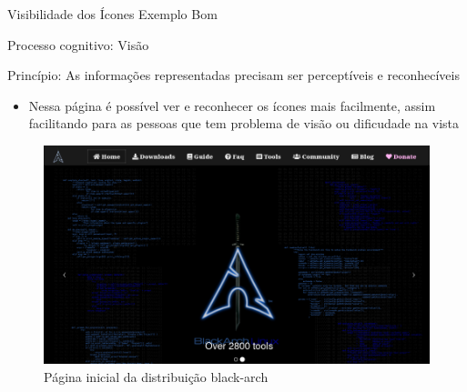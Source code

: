 \documentclass{beamer}
\begin{document}
\begin{frame}{Visibilidade dos Ícones Exemplo Bom}

Processo cognitivo: Visão

Princípio: As informações representadas precisam ser perceptíveis e reconhecíveis

\begin{itemize}
    \item Nessa página é possível ver e reconhecer os ícones mais facilmente, assim facilitando para as pessoas que tem problema de visão ou dificudade na vista
\end{itemize}
\begin{figure}
    \centering
    \includegraphics[scale=0.25]{images/black-arch-install.png}
    \caption{Página inicial da distribuição black-arch}
\end{figure}

\end{frame}
\end{document}
